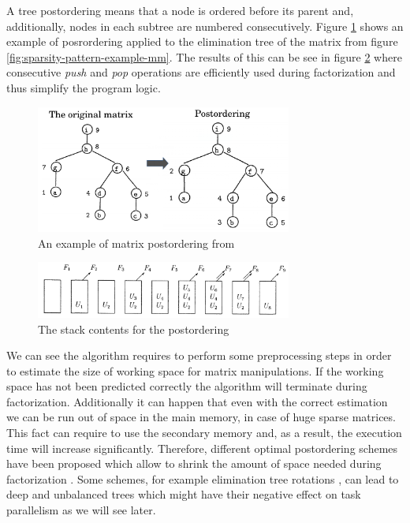 A tree postordering means that a node is ordered before its parent and, additionally, nodes in each subtree are numbered consecutively. Figure \ref{fig:mm-matrix-postordering} shows an example of posrordering applied to the elimination tree of the matrix from figure \ref{fig:sparsity-pattern-example-mm}. The results of this can be see in figure \ref{fig:mm-contrib-matrix-manipulation} where consecutive \textit{push} and \textit{pop} operations are efficiently used during factorization and thus simplify the program logic.\\


\figpointer{\ref{fig:mm-matrix-postordering}}
\begin{figure}[htpb]
  \centering
  \includegraphics[width=0.75\textwidth]{figures/chapter-2/elimination-tree-mm-postordering.png}
\caption{An example of matrix postordering from \cite{mult-frontal-original:2}}
\label{fig:mm-matrix-postordering}
\end{figure}


\figpointer{\ref{fig:mm-contrib-matrix-manipulation}}
\begin{figure}[htpb]
  \centering
  \includegraphics[width=0.75\textwidth]{figures/chapter-2/mm-contrib-matrix-manipulation.png}
\caption{The stack contents for the postordering \cite{mult-frontal-original:2}}
\label{fig:mm-contrib-matrix-manipulation}
\end{figure}


We can see the algorithm requires to perform some preprocessing steps in order to estimate the size of working space for matrix manipulations. If the working space has not been predicted correctly the algorithm will terminate during factorization. Additionally it can happen that even with the correct estimation we can be run out of space in the main memory, in case of huge sparse matrices. This fact can require to use the secondary memory and, as a result, the execution time will increase significantly. Therefore, different optimal postordering schemes have been proposed which allow to shrink the amount of space needed during factorization \cite{mm:optimal-tree-postordering} \cite{mm:elimination-tree-rotations}. Some schemes, for example elimination tree rotations \cite{mm:elimination-tree-rotations}, can lead to deep and unbalanced trees which might have their negative effect on task parallelism as we will see later.\\


